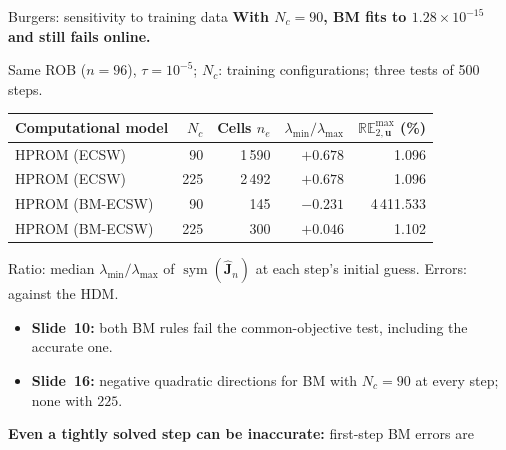 \documentclass[aspectratio=169]{beamer}
\newcommand{\vect}[1]{\boldsymbol{#1}}
\newcommand{\matr}[1]{\boldsymbol{#1}}
\begin{document}
\begin{frame}[t]{Burgers: sensitivity to training data}
\hypertarget{bmecsw-burgers-evidence}{}
\fontsize{9}{10.5}\selectfont
\setlength{\parskip}{0pt}
\textbf{With $N_c=90$, BM fits to $1.28\times10^{-15}$ and still fails online.}\par
\vspace{3pt}
{\fontsize{8}{9}\selectfont Same ROB ($n=96$), $\tau=10^{-5}$; $N_c$: training configurations; three tests of 500 steps.}\par
\vspace{3pt}
\begingroup
\centering\rmfamily
\fontsize{8.5}{10}\selectfont
\setlength{\tabcolsep}{6pt}
\renewcommand{\arraystretch}{1.08}
\begin{tabular}{@{}lrrrr@{}}
\toprule
Computational model & $N_c$ & Cells $n_e$ & $\lambda_{\min}/\lambda_{\max}$ & $\mathbb{RE}_{2,\vect{u}}^{\max}$ (\%)\\
\midrule
HPROM (ECSW) & 90 & 1\,590 & $+0.678$ & 1.096\\
HPROM (ECSW) & 225 & 2\,492 & $+0.678$ & 1.096\\
HPROM (BM-ECSW) & 90 & 145 & $-0.231$ & \textcolor{stanfordred}{4\,411.533}\\
HPROM (BM-ECSW) & 225 & 300 & $+0.046$ & 1.102\\
\bottomrule
\end{tabular}\par
\endgroup
\vspace{3pt}
{\fontsize{7.5}{8.5}\selectfont Ratio: median $\lambda_{\min}/\lambda_{\max}$ of $\operatorname{sym}(\widehat{\matr{J}}_n)$ at each step's initial guess. Errors: against the HDM.}\par
\vspace{3pt}
\begin{itemize}
\setlength{\itemsep}{1pt}
\setlength{\topsep}{0pt}
\item \textbf{Slide~10:} both BM rules fail the common-objective test, including the accurate one.
\item \textbf{Slide~16:} negative quadratic directions for BM with $N_c=90$ at every step; none with $225$.
\end{itemize}\par
\vspace{3pt}
\textbf{Even a tightly solved step can be inaccurate:} first-step BM errors are\par

\end{frame}
\end{document}
